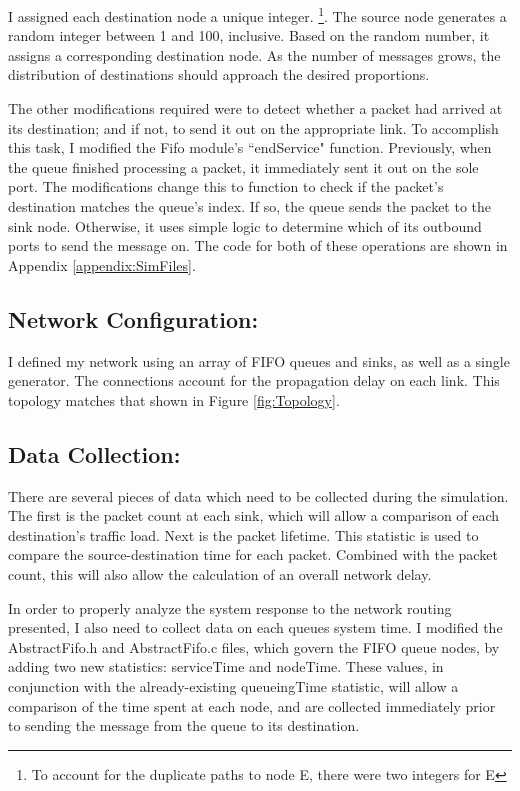 \documentclass{article}
\begin{document}
I assigned each destination node a unique integer. \footnote{To account for the duplicate paths to node E, there were two integers for E}.
The source node generates a random integer between 1 and 100, inclusive.  Based on the random number, it assigns a corresponding destination node.
As the number of messages grows, the distribution of destinations should approach the desired proportions.

The other modifications required were to detect whether a packet had arrived at its destination; and if not, to send it out on the appropriate link.
To accomplish this task, I modified the Fifo module's ``endService" function.
Previously, when the queue finished processing a packet, it immediately sent it out on the sole port.
The modifications change this to function to check if the packet's destination matches the queue's index.  
If so, the queue sends the packet to the sink node.
Otherwise, it uses simple logic to determine which of its outbound ports to send the message on.
The code for both of these operations are shown in Appendix \ref{appendix:SimFiles}.


\subsection{Network Configuration:}  
\label{subsec:Config}
I defined my network using an array of FIFO queues and sinks, as well as a single generator.
The connections account for the propagation delay on each link.
This topology matches that shown in Figure \ref{fig:Topology}.


\subsection{Data Collection:}
\label{subsec:DataCollection}
There are several pieces of data which need to be collected during the simulation.
The first is the packet count at each sink, which will allow a comparison of each destination's traffic load.
Next is the packet lifetime.  
This statistic is used to compare the source-destination time for each packet.
Combined with the packet count, this will also allow the calculation of an overall network delay.

In order to properly analyze the system response to the network routing presented, I also need to collect data on each queues system time.
I modified the AbstractFifo.h and AbstractFifo.c files, which govern the FIFO queue nodes, by adding two new statistics:  serviceTime and nodeTime.
These values, in conjunction with the already-existing queueingTime statistic, will allow a comparison of the time spent at each node, and are collected immediately prior to sending the message from the queue to its destination.
\end{document}
